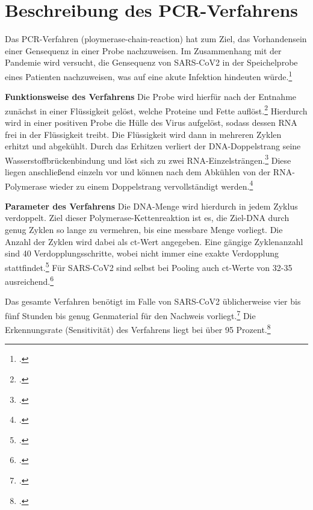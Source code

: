 \cleardoublepage

\section{Beschreibung des PCR-Verfahrens}
Das PCR-Verfahren (ploymerase-chain-reaction) hat zum Ziel, das Vorhandensein einer Gensequenz in einer Probe nachzuweisen.
Im Zusammenhang mit der Pandemie wird versucht, die Gensequenz von SARS-CoV2 in der Speichelprobe eines Patienten nachzuweisen, was auf eine akute Infektion hindeuten würde.\footcite{clewley_polymerase_1995}

\textbf{Funktionsweise des Verfahrens}\newline
Die Probe wird hierfür nach der Entnahme zunächst in einer Flüssigkeit gelöst, welche Proteine und Fette auflöst.\footcite{clewley_polymerase_1995}
Hierdurch wird in einer positiven Probe die Hülle des Virus aufgelöst, sodass dessen RNA frei in der Flüssigkeit treibt.
Die Flüssigkeit wird dann in mehreren Zyklen erhitzt und abgekühlt.
Durch das Erhitzen verliert der DNA-Doppelstrang seine Wasserstoffbrückenbindung und löst sich zu zwei RNA-Einzelsträngen.\footcite{wink_pcr_1994}
Diese liegen anschließend einzeln vor und können nach dem Abkühlen von der RNA-Polymerase wieder zu einem Doppelstrang vervollständigt werden.\footcite{wink_pcr_1994}

\textbf{Parameter des Verfahrens}\newline
Die DNA-Menge wird hierdurch in jedem Zyklus verdoppelt.
Ziel dieser Polymerase-Kettenreaktion ist es, die Ziel-DNA durch genug Zyklen so lange zu vermehren, bis eine messbare Menge vorliegt.
Die Anzahl der Zyklen wird dabei als ct-Wert angegeben.
Eine gängige Zyklenanzahl sind 40 Verdopplungsschritte, wobei nicht immer eine exakte Verdopplung stattfindet.\footcite{clewley_polymerase_1995}
Für SARS-CoV2 sind selbst bei Pooling auch ct-Werte von 32-35 ausreichend.\footcite{verwilt_evaluation_2021}

Das gesamte Verfahren benötigt im Falle von SARS-CoV2 üblicherweise vier bis fünf Stunden bis genug Genmaterial für den Nachweis vorliegt.\footcite{wink_pcr_1994}
Die Erkennungsrate (Sensitivität) des Verfahrens liegt bei über 95 Prozent.\footcite{verwilt_evaluation_2021}

\cleardoublepage

